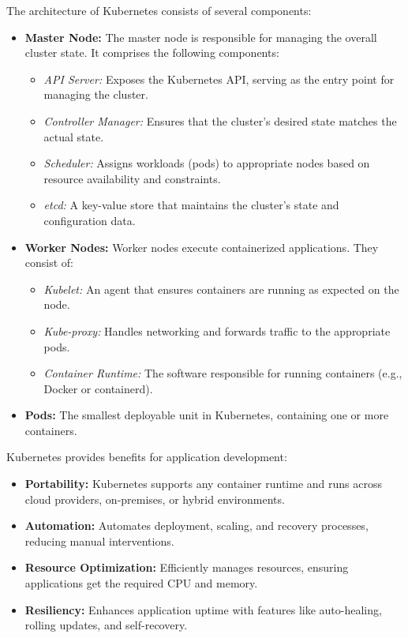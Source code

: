 The architecture of Kubernetes consists of several components:
\begin{itemize}
    \item \textbf{Master Node:} The master node is responsible for managing the
    overall cluster state. It comprises the following components:
    \begin{itemize}
        \item \textit{API Server:} Exposes the Kubernetes API, serving as the
        entry point for managing the cluster.
        \item \textit{Controller Manager:} Ensures that the cluster's desired
        state matches the actual state.
        \item \textit{Scheduler:} Assigns workloads (pods) to appropriate nodes
        based on resource availability and constraints.
        \item \textit{etcd:} A key-value store that maintains the cluster's
        state and configuration data.
    \end{itemize}
    \item \textbf{Worker Nodes:} Worker nodes execute containerized
    applications. They consist of:
    \begin{itemize}
        \item \textit{Kubelet:} An agent that ensures containers are running as
        expected on the node.
        \item \textit{Kube-proxy:} Handles networking and forwards traffic to
        the appropriate pods.
        \item \textit{Container Runtime:} The software responsible for running
        containers (e.g., Docker or containerd).
    \end{itemize}
    \item \textbf{Pods:} The smallest deployable unit in Kubernetes, containing
    one or more containers.
\end{itemize}

\newpage{}

Kubernetes provides benefits for application development:
\begin{itemize}
    \item \textbf{Portability:} Kubernetes supports any container runtime and
    runs across cloud providers, on-premises, or hybrid environments.
    \item \textbf{Automation:} Automates deployment, scaling, and recovery
    processes, reducing manual interventions.
    \item \textbf{Resource Optimization:} Efficiently manages resources,
    ensuring applications get the required CPU and memory.
    \item \textbf{Resiliency:} Enhances application uptime with features like
    auto-healing, rolling updates, and self-recovery.
\end{itemize}

